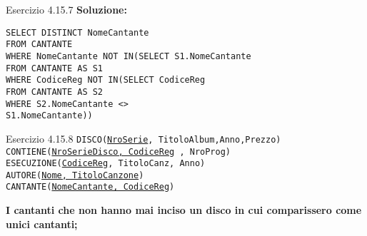 \begin{frame}{Esercizio 4.15.7}
    \textbf{Soluzione:}
    \vspace{1em}
    
    \texttt{SELECT DISTINCT NomeCantante\\FROM CANTANTE\\WHERE NomeCantante NOT IN(SELECT S1.NomeCantante\\\hspace{13em}FROM CANTANTE AS S1\\\hspace{13em}WHERE CodiceReg NOT IN(SELECT CodiceReg\\\hspace{24,5em}FROM CANTANTE AS S2\\\hspace{24,5em}WHERE S2.NomeCantante <> \\\hspace{24,5em}S1.NomeCantante))}
    \end{frame}
\begin{frame}{Esercizio 4.15.8}
    \texttt{DISCO(\underline{NroSerie}, TitoloAlbum,Anno,Prezzo)\\
    CONTIENE(\underline{NroSerieDisco, CodiceReg} , NroProg)\\
    ESECUZIONE(\underline{CodiceReg}, TitoloCanz, Anno)\\
    AUTORE(\underline{Nome, TitoloCanzone})\\
    CANTANTE(\underline{NomeCantante, CodiceReg})}
    \vspace{1em}
    
    \textbf{I cantanti che non hanno mai inciso un disco in cui comparissero come unici cantanti;}
\end{frame}

